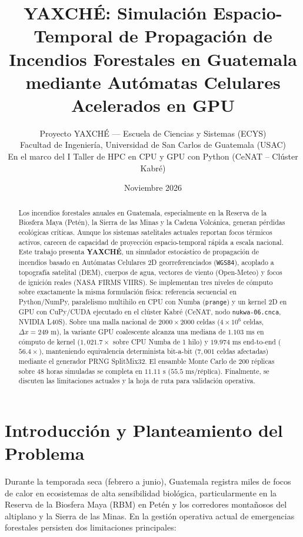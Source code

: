 \documentclass[twocolumn,10pt]{article}
\title{\textbf{YAXCHÉ: Simulación Espacio-Temporal de Propagación de Incendios Forestales en Guatemala mediante Autómatas Celulares Acelerados en GPU}}
\author{
  Proyecto YAXCHÉ --- Escuela de Ciencias y Sistemas (ECYS)\\
  Facultad de Ingeniería, Universidad de San Carlos de Guatemala (USAC)\\
  En el marco del I Taller de HPC en CPU y GPU con Python (CeNAT -- Clúster Kabré)
}
\date{Noviembre 2026}
\begin{document}
\maketitle

\begin{abstract}
Los incendios forestales anuales en Guatemala, especialmente en la Reserva de la Biosfera Maya (Petén), la Sierra de las Minas y la Cadena Volcánica, generan pérdidas ecológicas críticas. Aunque los sistemas satelitales actuales reportan focos térmicos activos, carecen de capacidad de proyección espacio-temporal rápida a escala nacional. Este trabajo presenta \textbf{YAXCHÉ}, un simulador estocástico de propagación de incendios basado en Autómatas Celulares 2D georreferenciados (\texttt{WGS84}), acoplado a topografía satelital (DEM), cuerpos de agua, vectores de viento (Open-Meteo) y focos de ignición reales (NASA FIRMS VIIRS). Se implementan tres niveles de cómputo sobre exactamente la misma formulación física: referencia secuencial en Python/NumPy, paralelismo multihilo en CPU con Numba (\texttt{prange}) y un kernel 2D en GPU con CuPy/CUDA ejecutado en el clúster Kabré (CeNAT, nodo \texttt{nukwa-06.cnca}, NVIDIA L40S). Sobre una malla nacional de $2000 \times 2000$ celdas ($4\times 10^6$ celdas, $\Delta x = 249\text{ m}$), la variante GPU coalescente alcanza una mediana de $1.103\text{ ms}$ en cómputo de kernel ($1{,}021.7\times$ sobre CPU Numba de 1 hilo) y $19.974\text{ ms}$ end-to-end ($56.4\times$), manteniendo equivalencia determinista bit-a-bit ($7{,}001$ celdas afectadas) mediante el generador PRNG SplitMix32. El ensamble Monte Carlo de $200$ réplicas sobre 48 horas simuladas se completa en $11.11\text{ s}$ ($55.5\text{ ms}/\text{réplica}$). Finalmente, se discuten las limitaciones actuales y la hoja de ruta para validación operativa.
\end{abstract}

\section{Introducción y Planteamiento del Problema}

Durante la temporada seca (febrero a junio), Guatemala registra miles de focos de calor en ecosistemas de alta sensibilidad biológica, particularmente en la Reserva de la Biosfera Maya (RBM) en Petén y los corredores montañosos del altiplano y la Sierra de las Minas. En la gestión operativa actual de emergencias forestales persisten dos limitaciones principales:
\end{document}
